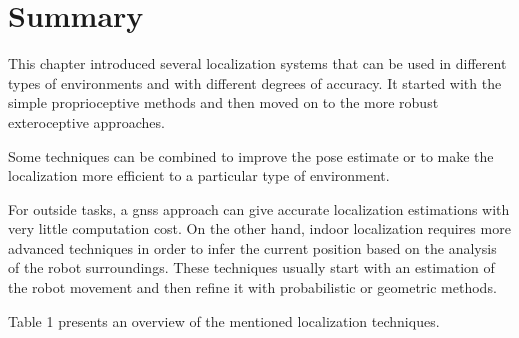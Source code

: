 \section{Summary}

This chapter introduced several localization systems that can be used in different types of environments and with different degrees of accuracy. It started with the simple proprioceptive methods and then moved on to the more robust exteroceptive approaches.

Some techniques can be combined to improve the pose estimate or to make the localization more efficient to a particular type of environment.

For outside tasks, a \gls{gnss} approach can give accurate localization estimations with very little computation cost. On the other hand, indoor localization requires more advanced techniques in order to infer the current position based on the analysis of the robot surroundings. These techniques usually start with an estimation of the robot movement and then refine it with probabilistic or geometric methods.

Table 1 presents an overview of the mentioned localization techniques.

